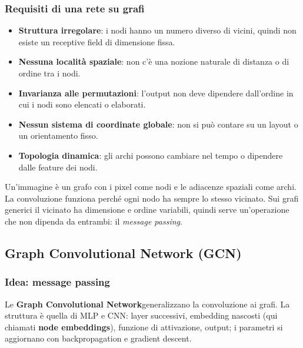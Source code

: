 \documentclass[11pt,a4paper]{article}
\begin{document}
\subsubsection{Requisiti di una rete su grafi}
\begin{itemize}
  \item \textbf{Struttura irregolare}: i nodi hanno un numero diverso di vicini,
        quindi non esiste un receptive field di dimensione fissa.
  \item \textbf{Nessuna località spaziale}: non c'è una nozione naturale di
        distanza o di ordine tra i nodi.
  \item \textbf{Invarianza alle permutazioni}: l'output non deve dipendere
        dall'ordine in cui i nodi sono elencati o elaborati.
  \item \textbf{Nessun sistema di coordinate globale}: non si può contare su un
        layout o un orientamento fisso.
  \item \textbf{Topologia dinamica}: gli archi possono cambiare nel tempo o
        dipendere dalle feature dei nodi.
\end{itemize}
 
\begin{importante}
Un'immagine è un grafo con i pixel come nodi e le adiacenze spaziali come archi.
La convoluzione funziona perché ogni nodo ha sempre lo stesso vicinato. Sui grafi
generici il vicinato ha dimensione e ordine variabili, quindi serve un'operazione
che non dipenda da entrambi: il \emph{message passing}.
\end{importante}
 
\subsection{Graph Convolutional Network (GCN)}
 
\subsubsection{Idea: message passing}
Le \textbf{Graph Convolutional Network}generalizzano la
convoluzione ai grafi. La struttura è quella di MLP e CNN: layer successivi,
embedding nascosti (qui chiamati \textbf{node embeddings}), funzione di
attivazione, output; i parametri si aggiornano con backpropagation e gradient
descent.
 
\end{document}
